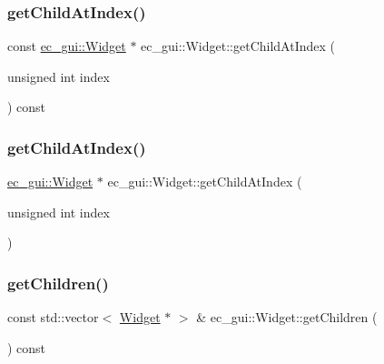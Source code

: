\subsubsection{\texorpdfstring{get\+Child\+At\+Index()}{getChildAtIndex()}\hspace{0.1cm}{\footnotesize\ttfamily [1/2]}}
{\footnotesize\ttfamily const \mbox{\hyperlink{classec__gui_1_1_widget}{ec\+\_\+gui\+::\+Widget}} $\ast$ ec\+\_\+gui\+::\+Widget\+::get\+Child\+At\+Index (\begin{DoxyParamCaption}\item[{unsigned int}]{index }\end{DoxyParamCaption}) const\hspace{0.3cm}{\ttfamily [virtual]}}

\mbox{\label{classec__gui_1_1_widget_a962c2593c1cf63a6076849941f800a8d}} 
\subsubsection{\texorpdfstring{get\+Child\+At\+Index()}{getChildAtIndex()}\hspace{0.1cm}{\footnotesize\ttfamily [2/2]}}
{\footnotesize\ttfamily \mbox{\hyperlink{classec__gui_1_1_widget}{ec\+\_\+gui\+::\+Widget}} $\ast$ ec\+\_\+gui\+::\+Widget\+::get\+Child\+At\+Index (\begin{DoxyParamCaption}\item[{unsigned int}]{index }\end{DoxyParamCaption})\hspace{0.3cm}{\ttfamily [virtual]}}

\mbox{\label{classec__gui_1_1_widget_ab8fa4e536b74b1dccec04cf79f70ac0e}} 
\subsubsection{\texorpdfstring{get\+Children()}{getChildren()}}
{\footnotesize\ttfamily const std\+::vector$<$ \mbox{\hyperlink{classec__gui_1_1_widget}{Widget}} $\ast$ $>$ \& ec\+\_\+gui\+::\+Widget\+::get\+Children (\begin{DoxyParamCaption}{ }\end{DoxyParamCaption}) const\hspace{0.3cm}{\ttfamily [virtual]}}

